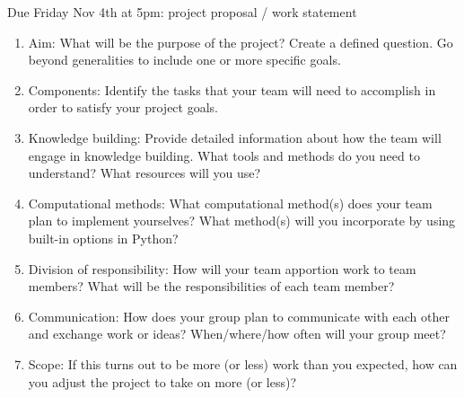 \documentclass[12pt,letterpaper,noanswers]{exam}
\begin{document}
 \pdfpageheight 11in 
  \pdfpagewidth 8.5in


Due Friday Nov 4th at 5pm: project proposal / work statement

\begin{enumerate}
    \item Aim: What will be the purpose of the project?  Create a defined question.  Go beyond generalities to include one or more specific goals.
    \item Components: Identify the tasks that your team will need to accomplish in order to satisfy your project goals.
    \item Knowledge building: Provide detailed information about how the team will engage in knowledge building.  What tools and methods do you need to understand?  What resources will you use?
    \item Computational methods: What computational method(s) does your team plan to implement yourselves?  What method(s) will you incorporate by using built-in options in Python?
    \item Division of responsibility: How will your team apportion work to team members?  What will be the responsibilities of each team member?
    \item Communication: How does your group plan to communicate with each other and exchange work or ideas?  When/where/how often will your group meet?
    \item Scope: If this turns out to be more (or less) work than you expected, how can you adjust the project to take on more (or less)?

\end{enumerate}

\end{document}
